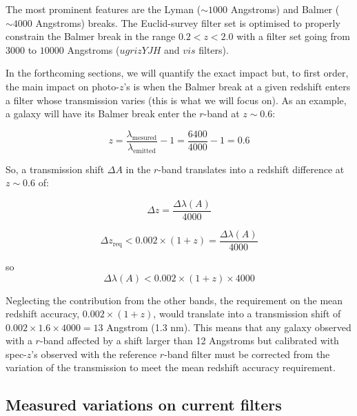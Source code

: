 \documentclass{article}
\begin{document}
The most prominent features are the Lyman (\(\sim1000\) Angstroms) and
Balmer (\(\sim4000\) Angstroms) breaks. The Euclid-survey filter set is
optimised to properly constrain the Balmer break in the range
\(0.2<z<2.0\) with a filter set going from \(3000\) to \(10000\)
Angstroms (\(ugrizYJH\) and \(vis\) filters).

In the forthcoming sections, we will quantify the exact impact but, to
first order, the main impact on photo-\(z\)'s is when the Balmer break
at a given redshift enters a filter whose transmission varies (this is
what we will focus on). As an example, a galaxy will have its Balmer
break enter the \(r\)-band at \(z\sim0.6\):

    \begin{equation}
z = \frac{\lambda_\mathrm{ mesured}}{\lambda_\mathrm{ emitted}} - 1 = \frac{6400}{4000}-1 = 0.6
\end{equation}

    So, a transmission shift \(\Delta A\) in the \(r\)-band translates into
a redshift difference at \(z\sim0.6\) of:

    \begin{equation}
\Delta z = \frac{\Delta \lambda (A)}{4000}
\end{equation}

\begin{equation}
\Delta z_\mathrm{req} < 0.002\times(1+z) = \frac{\Delta \lambda(A)}{4000}
\end{equation}

so \begin{equation}
\Delta \lambda(A) < 0.002\times(1+z)\times4000
\end{equation}

    Neglecting the contribution from the other bands, the requirement on the
mean redshift accuracy, \(0.002\times(1+z)\), would translate into a
transmission shift of \(0.002\times1.6\times4000=13\) Angstrom (1.3 nm).
This means that any galaxy observed with a \(r\)-band affected by a
shift larger than 12 Angstroms but calibrated with spec-\(z\)'s observed
with the reference \(r\)-band filter must be corrected from the
variation of the transmission to meet the mean redshift accuracy
requirement.

\hypertarget{measured-variations-on-current-filters}{%
\subsection{Measured variations on current
filters}\label{measured-variations-on-current-filters}}
\end{document}
